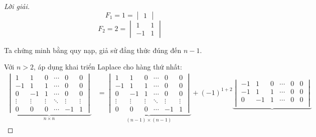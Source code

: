 \documentclass[class=nhvh-linear-algebra,crop=false]{standalone}
\begin{document}
\begin{proof}[Lời giải]
    \[
        F_{1} = 1 = \begin{vmatrix}1\end{vmatrix}
    \]
    \[
        F_{2} = 2 = \begin{vmatrix}1 & 1 \\ -1 & 1 \end{vmatrix}
    \]
    \par Ta chứng minh bằng quy nạp, giả sử đẳng thức đúng đến $n-1$.
    \par Với $n > 2$, áp dụng khai triển Laplace cho hàng thứ nhất:
    \begingroup{}
    \allowdisplaybreaks{}
    \begin{align*}
        \underbrace{\begin{vmatrix}
                            1      & 1      & 0      & \cdots & 0      & 0      \\
                            -1     & 1      & 1      & \cdots & 0      & 0      \\
                            0      & -1     & 1      & \cdots & 0      & 0      \\
                            \vdots & \vdots & \vdots & \ddots & \vdots & \vdots \\
                            0      & 0      & 0      & \cdots & -1     & 1
                        \end{vmatrix}}_{n\times n}
         & =
        \underbrace{\begin{vmatrix}
                            1      & 1      & 0      & \cdots & 0      & 0      \\
                            -1     & 1      & 1      & \cdots & 0      & 0      \\
                            0      & -1     & 1      & \cdots & 0      & 0      \\
                            \vdots & \vdots & \vdots & \ddots & \vdots & \vdots \\
                            0      & 0      & 0      & \cdots & -1     & 1
                        \end{vmatrix}}_{(n-1)\times (n-1)}
        +
        {(-1)}^{1+2}
        \underbrace{\begin{vmatrix}
                            -1     & 1      & 0      & \cdots & 0      & 0      \\
                            -1     & 1      & 1      & \cdots & 0      & 0      \\
                            0      & -1     & 1      & \cdots & 0      & 0      \\

\end{vmatrix}}
\end{align*}
\end{proof}
\end{document}
